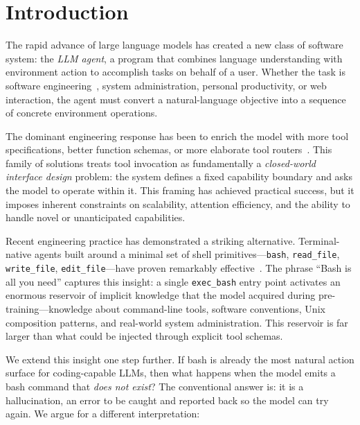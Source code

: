 \documentclass[11pt]{article}
\begin{document}
\section{Introduction}
\label{sec:intro}

The rapid advance of large language models has created a new class of software system: the \emph{LLM agent}, a program that combines language understanding with environment action to accomplish tasks on behalf of a user.
Whether the task is software engineering~\citep{sweagent2024,openhands2024}, system administration, personal productivity, or web interaction, the agent must convert a natural-language objective into a sequence of concrete environment operations.

The dominant engineering response has been to enrich the model with more tool specifications, better function schemas, or more elaborate tool routers~\citep{toolformer2023,gorilla2023,qin2024toolllm}.
This family of solutions treats tool invocation as fundamentally a \emph{closed-world interface design} problem: the system defines a fixed capability boundary and asks the model to operate within it.
This framing has achieved practical success, but it imposes inherent constraints on scalability, attention efficiency, and the ability to handle novel or unanticipated capabilities.

Recent engineering practice has demonstrated a striking alternative.
Terminal-native agents built around a minimal set of shell primitives---\texttt{bash}, \texttt{read\_file}, \texttt{write\_file}, \texttt{edit\_file}---have proven remarkably effective~\citep{sweagent2024,shihipar2026bash}.
The phrase ``Bash is all you need'' captures this insight: a single \texttt{exec\_bash} entry point activates an enormous reservoir of implicit knowledge that the model acquired during pre-training---knowledge about command-line tools, software conventions, Unix composition patterns, and real-world system administration.
This reservoir is far larger than what could be injected through explicit tool schemas.

We extend this insight one step further.
If bash is already the most natural action surface for coding-capable LLMs, then what happens when the model emits a bash command that \emph{does not exist}?
The conventional answer is: it is a hallucination, an error to be caught and reported back so the model can try again.
We argue for a different interpretation:
\end{document}
